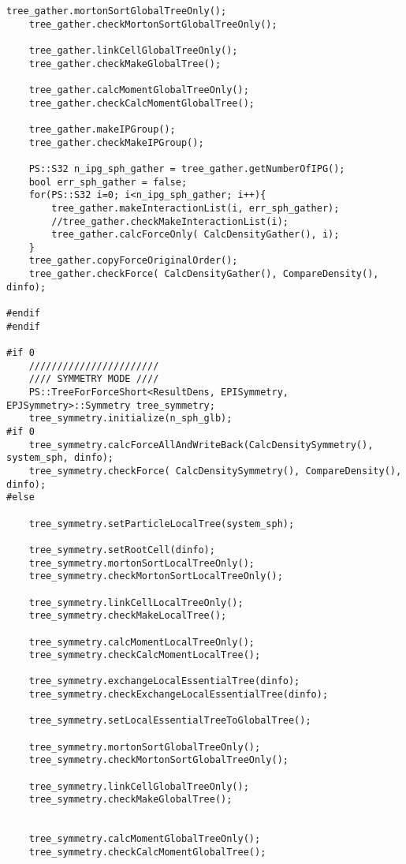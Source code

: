 \begin{lstlisting}[caption=開放境界、モートンソート、ローカルツリー構築、モーメント計算、LET交換、グローバルツリー構築、相互作用計算のテスト]
    tree_gather.mortonSortGlobalTreeOnly();
    tree_gather.checkMortonSortGlobalTreeOnly();

    tree_gather.linkCellGlobalTreeOnly();
    tree_gather.checkMakeGlobalTree();

    tree_gather.calcMomentGlobalTreeOnly();
    tree_gather.checkCalcMomentGlobalTree();

    tree_gather.makeIPGroup();
    tree_gather.checkMakeIPGroup();

    PS::S32 n_ipg_sph_gather = tree_gather.getNumberOfIPG();
    bool err_sph_gather = false;
    for(PS::S32 i=0; i<n_ipg_sph_gather; i++){
        tree_gather.makeInteractionList(i, err_sph_gather);
        //tree_gather.checkMakeInteractionList(i);
        tree_gather.calcForceOnly( CalcDensityGather(), i);
    }
    tree_gather.copyForceOriginalOrder();
    tree_gather.checkForce( CalcDensityGather(), CompareDensity(), dinfo);

#endif
#endif

#if 0
    ///////////////////////
    //// SYMMETRY MODE ////
    PS::TreeForForceShort<ResultDens, EPISymmetry, EPJSymmetry>::Symmetry tree_symmetry;
    tree_symmetry.initialize(n_sph_glb);
#if 0
    tree_symmetry.calcForceAllAndWriteBack(CalcDensitySymmetry(), system_sph, dinfo);
    tree_symmetry.checkForce( CalcDensitySymmetry(), CompareDensity(), dinfo);
#else

    tree_symmetry.setParticleLocalTree(system_sph);

    tree_symmetry.setRootCell(dinfo);
    tree_symmetry.mortonSortLocalTreeOnly();
    tree_symmetry.checkMortonSortLocalTreeOnly();

    tree_symmetry.linkCellLocalTreeOnly();
    tree_symmetry.checkMakeLocalTree();

    tree_symmetry.calcMomentLocalTreeOnly();
    tree_symmetry.checkCalcMomentLocalTree();

    tree_symmetry.exchangeLocalEssentialTree(dinfo);
    tree_symmetry.checkExchangeLocalEssentialTree(dinfo);

    tree_symmetry.setLocalEssentialTreeToGlobalTree();

    tree_symmetry.mortonSortGlobalTreeOnly();
    tree_symmetry.checkMortonSortGlobalTreeOnly();

    tree_symmetry.linkCellGlobalTreeOnly();
    tree_symmetry.checkMakeGlobalTree();


    tree_symmetry.calcMomentGlobalTreeOnly();
    tree_symmetry.checkCalcMomentGlobalTree();



\end{lstlisting}
